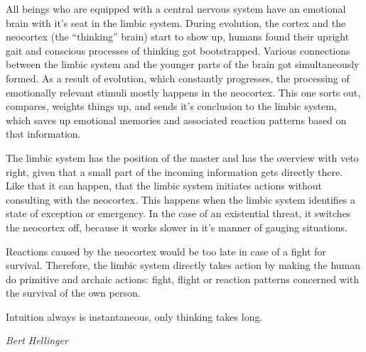 \documentclass[../main.tex]{subfiles}
\begin{document}
All beings who are equipped with a central nervous system have an emotional brain with it's seat in the limbic system.
During evolution, the cortex and the neocortex (the ``thinking'' brain) start to show up, humans found their upright gait and conscious processes of thinking got bootstrapped.
Various connections between the limbic system and the younger parts of the brain got simultaneously formed.
As a result of evolution, which constantly progresses, the processing of emotionally relevant stimuli mostly happens in the neocortex.
This one sorts out, compares, weights things up, and sends it's conclusion to the limbic system, which saves up emotional memories and associated reaction patterns based on that information.

The limbic system has the position of the master and has the overview with veto right, given that a small part of the incoming information gets directly there.
Like that it can happen, that the limbic system initiates actions without consulting with the neocortex.
This happens when the limbic system identifies a state of exception or emergency.
In the case of an existential threat, it switches the neocortex off, because it works slower in it's manner of gauging  situations.

Reactions caused by the neocortex would be too late in case of a fight for survival.
Therefore, the limbic system directly takes action by making the human do primitive and archaic actions: fight, flight or reaction patterns concerned with the survival of the own person.

\epigraph{Intuition always is instantaneous, only thinking takes long.}{\textit{Bert Hellinger}}
\end{document}
